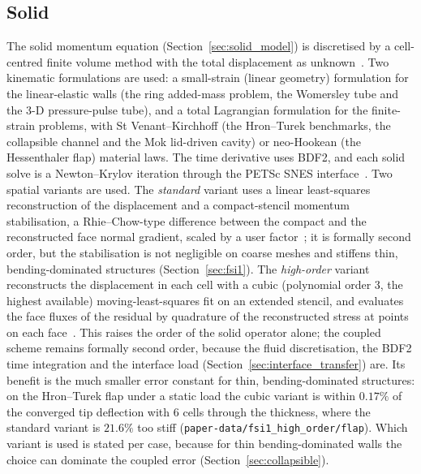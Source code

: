 \subsection{Solid}\label{sec:solid_solver}

The solid momentum equation (Section~\ref{sec:solid_model}) is discretised by a cell-centred finite volume method with the total displacement as unknown~\citep{Jasak2000, Cardiff2021}.
Two kinematic formulations are used: a small-strain (linear geometry) formulation for the linear-elastic walls (the ring added-mass problem, the Womersley tube and the 3-D pressure-pulse tube), and a total Lagrangian formulation for the finite-strain problems, with St Venant--Kirchhoff (the Hron--Turek benchmarks, the collapsible channel and the Mok lid-driven cavity) or neo-Hookean (the Hessenthaler flap) material laws.
The time derivative uses BDF2, and each solid solve is a Newton--Krylov iteration through the PETSc SNES interface~\citep{PETSc, Cardiff2026}.
Two spatial variants are used.
The \emph{standard} variant uses a linear least-squares reconstruction of the displacement and a compact-stencil momentum stabilisation, a Rhie--Chow-type difference between the compact and the reconstructed face normal gradient, scaled by a user factor~\citep{Cardiff2026}; it is formally second order, but the stabilisation is not negligible on coarse meshes and stiffens thin, bending-dominated structures (Section~\ref{sec:fsi1}).
The \emph{high-order} variant reconstructs the displacement in each cell with a cubic (polynomial order 3, the highest available) moving-least-squares fit on an extended stencil, and evaluates the face fluxes of the residual by quadrature of the reconstructed stress at points on each face~\citep{Batistic2026}.
This raises the order of the solid operator alone; the coupled scheme remains formally second order, because the fluid discretisation, the BDF2 time integration and the interface load (Section~\ref{sec:interface_transfer}) are.
Its benefit is the much smaller error constant for thin, bending-dominated structures: on the Hron--Turek flap under a static load the cubic variant is within $0.17\%$ of the converged tip deflection with 6 cells through the thickness, where the standard variant is $21.6\%$ too stiff (\texttt{paper-data/fsi1\_high\_order/flap}).
Which variant is used is stated per case, because for thin bending-dominated walls the choice can dominate the coupled error (Section~\ref{sec:collapsible}).

